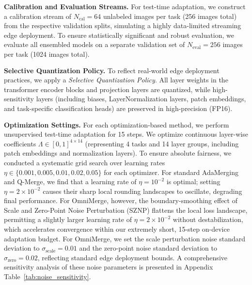 \textbf{Calibration and Evaluation Streams.}
For test-time adaptation, we construct a calibration stream of $N_{\text{cal}} = 64$ unlabeled images per task (256 images total) from the respective validation splits, simulating a highly data-limited streaming edge deployment. To ensure statistically significant and robust evaluation, we evaluate all ensembled models on a separate validation set of $N_{\text{eval}} = 256$ images per task (1024 images total).

\textbf{Selective Quantization Policy.}
To reflect real-world edge deployment practices, we apply a \emph{Selective Quantization Policy}. All layer weights in the transformer encoder blocks and projection layers are quantized, while high-sensitivity layers (including biases, LayerNormalization layers, patch embeddings, and task-specific classification heads) are preserved in high-precision (FP16).

\textbf{Optimization Settings.}
For each optimization-based method, we perform unsupervised test-time adaptation for 15 steps. We optimize continuous layer-wise coefficients $\Lambda \in [0, 1]^{4 \times 14}$ (representing 4 tasks and 14 layer groups, including patch embeddings and normalization layers). To ensure absolute fairness, we conducted a systematic grid search over learning rates $\eta \in \{0.001, 0.005, 0.01, 0.02, 0.05\}$ for each optimizer. For standard AdaMerging and Q-Merge, we find that a learning rate of $\eta = 10^{-2}$ is optimal; setting $\eta = 2 \times 10^{-2}$ causes their sharp local rounding landscapes to oscillate, degrading final performance. For OmniMerge, however, the boundary-smoothing effect of Scale and Zero-Point Noise Perturbation (SZNP) flattens the local loss landscape, permitting a slightly larger learning rate of $\eta = 2 \times 10^{-2}$ without destabilization, which accelerates convergence within our extremely short, 15-step on-device adaptation budget. For OmniMerge, we set the scale perturbation noise standard deviation to $\sigma_{\text{scale}} = 0.01$ and the zero-point noise standard deviation to $\sigma_{\text{zero}} = 0.02$, reflecting standard edge deployment bounds. A comprehensive sensitivity analysis of these noise parameters is presented in Appendix Table~\ref{tab:noise_sensitivity}.

